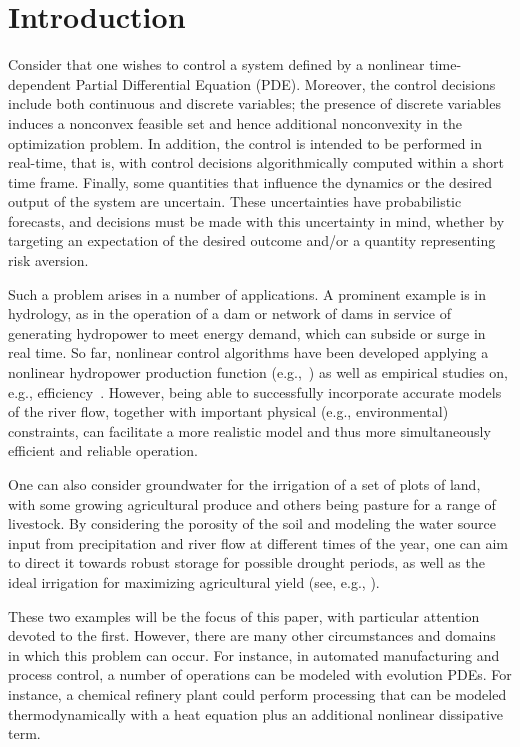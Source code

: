 \documentclass{article}
\newcommand{\1}{\mathds{1}}          %
\theoremstyle{definition}
\begin{document}
\tableofcontents
\begin{sloppypar}

\section{Introduction}

Consider that one wishes to control a system defined by a nonlinear time-dependent Partial Differential Equation (PDE). Moreover, the control decisions include both continuous and discrete variables; the presence of discrete variables induces a nonconvex feasible set and hence additional nonconvexity in the optimization problem. In addition, the control is intended to be performed in real-time, that is, with control decisions algorithmically computed within a short time frame. Finally, some quantities that influence the dynamics or the desired output of the system are uncertain. These uncertainties have probabilistic forecasts, and decisions must be made with this uncertainty in mind, whether by targeting an expectation of the desired outcome and/or a quantity representing risk aversion. 

Such a problem arises in a number of applications. A prominent example is in hydrology, as in the operation of a dam or network of dams in service of generating hydropower to meet energy demand, which can subside or surge in real time. So far, nonlinear control algorithms have been developed applying a nonlinear hydropower production function (e.g.,~\cite{hamann2015coordinated}) as well as empirical studies on, e.g., efficiency~\cite{zheng2013evaluation}. However, being able to successfully incorporate accurate models of the river flow, together with important physical (e.g., environmental) constraints, can facilitate a more realistic model and thus more simultaneously efficient and reliable operation. 

One can also consider groundwater for the irrigation of a set of plots of land, with some growing agricultural produce and others being pasture for a range of livestock. By considering the porosity of the soil and modeling the water source input from precipitation and river flow at different times of the year, one can aim to direct it towards robust storage for possible drought periods, as well as the ideal irrigation for maximizing agricultural yield (see, e.g., \cite{Berardi_Difonzo_Guglielmi_2023,AllaBerardiSaluzzi2025}).

These two examples will be the focus of this paper, with particular attention devoted to the first. However, there are many other circumstances and domains in which this problem can occur. For instance, in automated manufacturing and process control, a number of operations can be modeled with evolution PDEs. For instance, a chemical refinery plant could perform processing that can be modeled thermodynamically with a heat equation plus an additional nonlinear dissipative term.


\end{sloppypar}
\end{document}
